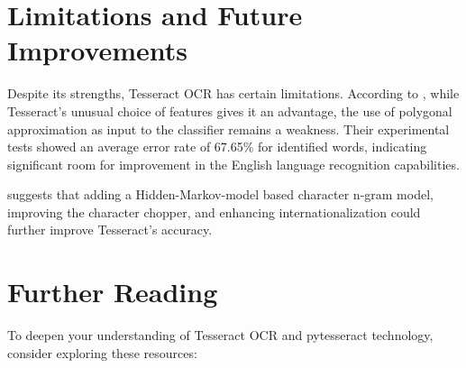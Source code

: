 \section{Limitations and Future Improvements}

Despite its strengths, Tesseract OCR has certain limitations. According to \cite{Joshi:2021}, while Tesseract's unusual choice of features gives it an advantage, the use of polygonal approximation as input to the classifier remains a weakness. Their experimental tests showed an average error rate of 67.65\% for identified words, indicating significant room for improvement in the English language recognition capabilities.

\cite{Joshi:2021} suggests that adding a Hidden-Markov-model based character n-gram model, improving the character chopper, and enhancing internationalization could further improve Tesseract's accuracy.

\section{Further Reading}

To deepen your understanding of Tesseract OCR and pytesseract technology, consider exploring these resources:

